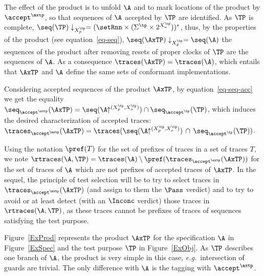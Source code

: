 \documentclass{LMCS}
\theoremstyle{plain}\newtheorem{proposition}[thm]{Proposition}
\def\eg{{\em e.g.}}
\begin{document}
The effect of the product is to unfold $\A$
and to mark locations of the product by $\accept^\axtp$, 
so that sequences of $\A$ accepted by $\TP$ are identified.
As $\TP$ is complete, 
$\seq(\TP)\downarrow_{X_p^\tp} = (\setRnn \times (\Sigma^\tp \times 2^{X_o^\tp}))^*$,
thus, by the properties of the product (see equation~\ref{eq-seq}),
$\seq(\AxTP)\downarrow_{X_p^\tp} = \seq(\A)$ 
\ie the sequences of the product after removing resets of proper clocks of $\TP$
are the sequences of $\A$.
As a consequence 
$\traces(\AxTP) = \traces(\A)$, which entails that $\AxTP$ and $\A$
define the same sets of conformant implementations.  

 Considering accepted sequences of the product $\AxTP$, 
by equation~\ref{eq-seq-acc} we  get the equality
$\seq_{\accept^\axtp}(\AxTP) = \seq(\A\!\!\uparrow^{(X_p^\tp,X_o^\tp)}) \cap
\seq_{\accept^\tp}(\TP)$, 
which induces the desired characterization of accepted traces: 
$\traces_{\accept^\axtp}(\AxTP) = \traces(\seq(\A\!\!\uparrow^{(X_p^\tp,X_o^\tp)}) \, \cap \,\seq_{\accept^\tp}(\TP))$.

Using the notation $\pref(T)$ 
for the set of prefixes
of traces in a set of traces $T$,
we note $\rtraces(\A,\TP) = \traces(\A) \setminus \pref(\traces_{\accept^\axtp}(\AxTP))$
for the set of traces of $\A$ which are not prefixes of accepted traces of $\AxTP$.
In the sequel, 
the principle of test selection will be to try to select traces in
$\traces_{\accept^\axtp}(\AxTP)$ (and assign to them the $\Pass$ verdict)
and to try to avoid or at least detect (with an $\Inconc$ verdict) 
those traces in $\rtraces(\A,\TP)$, as
these traces cannot be prefixes of traces of sequences satisfying the test purpose.

\begin{exa}
Figure~\ref{ExProd} represents the product $\AxTP$ for the specification
$\A$ in Figure~\ref{ExSpec} and the test purpose $\TP$ in
Figure~\ref{ExObj}. 
As $\TP$ describes one branch of $\A$, the product is very simple in this case,
\eg~intersection of guards are trivial.
The only difference with $\A$ is the  tagging with $\accept^\axtp$.
\end{exa}
\end{document}
